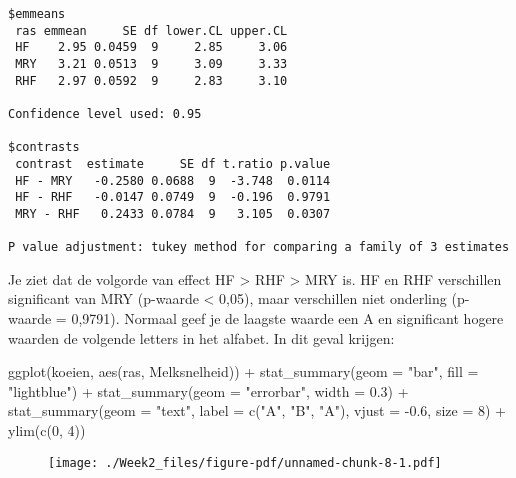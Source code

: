 \documentclass[
  letterpaper,
  DIV=11,
  numbers=noendperiod]{scrreprt}
\newenvironment{Shaded}{\begin{snugshade}}{\end{snugshade}}
\newcommand{\AttributeTok}[1]{\textcolor[rgb]{0.40,0.45,0.13}{#1}}
\newcommand{\DecValTok}[1]{\textcolor[rgb]{0.68,0.00,0.00}{#1}}
\newcommand{\FloatTok}[1]{\textcolor[rgb]{0.68,0.00,0.00}{#1}}
\newcommand{\FunctionTok}[1]{\textcolor[rgb]{0.28,0.35,0.67}{#1}}
\newcommand{\NormalTok}[1]{\textcolor[rgb]{0.00,0.23,0.31}{#1}}
\newcommand{\SpecialCharTok}[1]{\textcolor[rgb]{0.37,0.37,0.37}{#1}}
\newcommand{\StringTok}[1]{\textcolor[rgb]{0.13,0.47,0.30}{#1}}
\theoremstyle{definition}
\theoremstyle{remark}
\begin{document}
\begin{verbatim}
$emmeans
 ras emmean     SE df lower.CL upper.CL
 HF    2.95 0.0459  9     2.85     3.06
 MRY   3.21 0.0513  9     3.09     3.33
 RHF   2.97 0.0592  9     2.83     3.10

Confidence level used: 0.95 

$contrasts
 contrast  estimate     SE df t.ratio p.value
 HF - MRY   -0.2580 0.0688  9  -3.748  0.0114
 HF - RHF   -0.0147 0.0749  9  -0.196  0.9791
 MRY - RHF   0.2433 0.0784  9   3.105  0.0307

P value adjustment: tukey method for comparing a family of 3 estimates 
\end{verbatim}

Je ziet dat de volgorde van effect HF \textgreater{} RHF \textgreater{}
MRY is. HF en RHF verschillen significant van MRY (p-waarde \textless{}
0,05), maar verschillen niet onderling (p-waarde = 0,9791). Normaal geef
je de laagste waarde een A en significant hogere waarden de volgende
letters in het alfabet. In dit geval krijgen:

\begin{Shaded}
\begin{Highlighting}[]
\FunctionTok{ggplot}\NormalTok{(koeien, }\FunctionTok{aes}\NormalTok{(ras, Melksnelheid)) }\SpecialCharTok{+}
  \FunctionTok{stat\_summary}\NormalTok{(}\AttributeTok{geom =} \StringTok{"bar"}\NormalTok{, }\AttributeTok{fill =} \StringTok{"lightblue"}\NormalTok{) }\SpecialCharTok{+}
  \FunctionTok{stat\_summary}\NormalTok{(}\AttributeTok{geom =} \StringTok{"errorbar"}\NormalTok{, }\AttributeTok{width =} \FloatTok{0.3}\NormalTok{) }\SpecialCharTok{+}
  \FunctionTok{stat\_summary}\NormalTok{(}\AttributeTok{geom =} \StringTok{"text"}\NormalTok{, }\AttributeTok{label =} \FunctionTok{c}\NormalTok{(}\StringTok{"A"}\NormalTok{, }\StringTok{"B"}\NormalTok{, }\StringTok{"A"}\NormalTok{), }\AttributeTok{vjust =} \SpecialCharTok{{-}}\FloatTok{0.6}\NormalTok{, }\AttributeTok{size  =} \DecValTok{8}\NormalTok{) }\SpecialCharTok{+}
  \FunctionTok{ylim}\NormalTok{(}\FunctionTok{c}\NormalTok{(}\DecValTok{0}\NormalTok{, }\DecValTok{4}\NormalTok{))}
\end{Highlighting}
\end{Shaded}

\begin{figure}[H]

{\centering \texttt{[image: ./Week2\_files/figure-pdf/unnamed-chunk-8-1.pdf]}

}

\end{figure}
\end{document}
